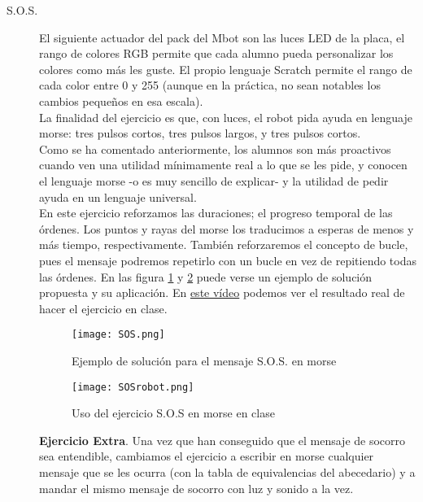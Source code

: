 \begin{description}
\item [S.O.S.]\label{ej:sos}
El siguiente actuador del pack del Mbot son las luces LED de la placa, el rango de colores RGB permite que cada alumno pueda personalizar los colores como más les guste. El propio lenguaje Scratch permite el rango de cada color entre 0 y 255 (aunque en la práctica, no sean notables los cambios pequeños en esa escala).\\
La finalidad del ejercicio es que, con luces, el robot pida ayuda en lenguaje morse: tres pulsos cortos, tres pulsos largos, y tres pulsos cortos. \\
Como se ha comentado anteriormente, los alumnos son más proactivos cuando ven una utilidad mínimamente real a lo que se les pide, y conocen el lenguaje morse -o es muy sencillo de explicar- y la utilidad de pedir ayuda en un lenguaje universal.\\
En este ejercicio reforzamos las duraciones; el progreso temporal de las órdenes. Los puntos y rayas del morse los traducimos a esperas de menos y más tiempo, respectivamente. También reforzaremos el concepto de bucle, pues el mensaje podremos repetirlo con un bucle en vez de repitiendo todas las órdenes.  En las figura \ref{img:SOS} y \ref{img:SOSrobot} puede verse un ejemplo de solución propuesta y su aplicación. En \href{https://www.youtube.com/watch?v=k6QSnIkRVyo}{este vídeo} podemos ver el resultado real de hacer el ejercicio en clase. \\
\begin{figure}[h]
	\centering
	\texttt{[image: SOS.png]}	
	\caption{Ejemplo de solución para el mensaje S.O.S. en morse}
	\label{img:SOS}
\end{figure}
\begin{figure}[h]
	\centering
	\texttt{[image: SOSrobot.png]}	
	\caption{Uso del ejercicio S.O.S en morse en clase}
	\label{img:SOSrobot}
\end{figure}
\textbf{Ejercicio Extra}. Una vez que han conseguido que el mensaje de socorro sea entendible, cambiamos el ejercicio a escribir en morse cualquier mensaje que se les ocurra (con la tabla de equivalencias del abecedario) y a mandar el mismo mensaje de socorro con luz y sonido a la vez.


\end{description}
